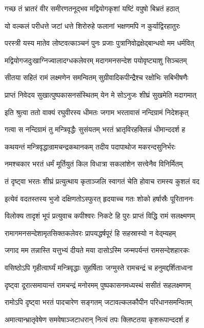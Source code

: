 \twolineshloka
{गच्छ तं भ्रातरं वीर समीरणतनूद्भव}
{मद्वियोगकृशां यष्टिं वपुषो बिभ्रतं हठात्}%

\twolineshloka
{यो वल्कलं परीधत्ते जटां धत्ते शिरोरुहे}
{फलानां भक्षणमपि न कुर्याद्विरहातुरः}%

\twolineshloka
{परस्त्री यस्य मातेव लोष्टवत्काञ्चनं पुनः}
{प्रजाः पुत्रानिवोद्रक्षेद्बान्धवो मम धर्मवित्}%

\twolineshloka
{मद्वियोगजदुःखाग्निज्वालादग्धकलेवरम्}
{मदागमनसन्देश पयोवृष्ट्याशु सिञ्चतम्}%

\twolineshloka
{सीतया सहितं रामं लक्ष्मणेन समन्वितम्}
{सुग्रीवादिकपीन्द्रैश्च रक्षोभिः सबिभीषणैः}%

\twolineshloka
{प्राप्तं निवेदय सुखात्पुष्पकासनसंस्थितम्}
{येन मे सोऽनुजः शीघ्रं सुखमेति मदागमात्}%

\twolineshloka
{इति श्रुत्वा ततो वाक्यं रघुवीरस्य धीमतः}
{जगाम भरतावासं नन्दिग्रामं निदेशकृत्}%

\twolineshloka
{गत्वा स नन्दिग्रामं तु मन्त्रिवृद्धैः सुसंयतम्}
{भरतं भ्रातृविरहक्लिन्नं धीमान्ददर्श ह}%

\twolineshloka
{कथयन्तं मन्त्रिवृद्धान्रामचन्द्रकथानकम्}
{तदीय पदापाथोज मकरन्दसुनिर्भरः}%

\twolineshloka
{नमश्चकार भरतं धर्मं मूर्तियुतं किल}
{विधात्रा सकलांशेन सत्त्वेनैव विनिर्मितम्}%

\twolineshloka
{तं दृष्ट्वा भरतः शीघ्रं प्रत्युत्थाय कृताञ्जलि}
{स्वागतं चेति होवाच रामस्य कुशलं वद}%

\twolineshloka
{इत्येवं वदतस्तस्य भुजो दक्षिणतोऽस्फुरत्}
{हृदयाच्च गतः शोको हर्षास्रैः पूरिताननः}%

\twolineshloka
{विलोक्य तादृशं भूपं प्रत्युवाच कपीश्वरः}
{निकटे हि पुरः प्राप्तं विद्धि रामं सलक्ष्मणम्}%

\twolineshloka
{रामागमनसन्देशामृतसिक्तकलेवरः}
{प्रापयद्धर्षपूरं हि सहस्रास्यो न वेद्म्यहम्}%

\twolineshloka
{जगाद मम तन्नास्ति यत्तुभ्यं दीयते मया}
{दासोऽस्मि जन्मपर्यन्तं रामसन्देशहारकः}%

\twolineshloka
{वसिष्ठोऽपि गृहीत्वार्घ्यं मन्त्रिवृद्धाः सुहर्षिताः}
{जग्मुस्ते रामचन्द्रं च हनुमद्दर्शिताध्वना}%

\twolineshloka
{दृष्ट्वा दूरात्समायान्तं रामचन्द्रं मनोरमम्}
{पुष्पकासनमध्यस्थं ससीतं सहलक्ष्मणम्}%

\twolineshloka
{रामोऽपि दृष्ट्वा भरतं पादचारेण सङ्गतम्}
{जटावल्कलकौपीन परिधानसमन्वितम्}%

\twolineshloka
{अमात्यान्भ्रातृवेषेण समवेषाञ्जटाधरान्}
{नित्यं तपः क्लिष्टतया कृशरूपान्ददर्श ह}%

